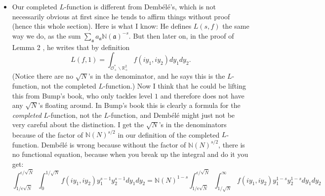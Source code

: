 \documentclass{article}
\theoremstyle{plain}
\begin{document}
\begin{itemize}
\item Our completed $L$-function is different from Demb\'{e}l\'{e}'s, which is not necessarily obvious at first since he tends to affirm things without proof (hence this whole section). Here is what I know: He defines $L(s,f)$ the same way we do, as the sum $\sum_{\mathfrak{a}}a_{\mathfrak{a}}\mathbb{N}(\mathfrak{a})^{-s}$. But then later on, in the proof of Lemma 2 \cite{dembele}, he writes that by definition
\begin{equation*}
L(f,1)= \int_{\mathcal{O}_+^*\backslash \mathbb{R}^2_+} f\left(iy_1,iy_2\right) dy_1 dy_2.
\end{equation*}
(Notice there are no $\sqrt{N}$'s in the denominator, and he says this is the $L$-function, not the completed $L$-function.) Now I think that he could be lifting this from Bump's book, who only tackles level $1$ and therefore does not have any $\sqrt{N}$'s floating around. In Bump's book this is clearly a formula for the \emph{completed} $L$-function, not the $L$-function, and Demb\'{e}l\'{e} might just not be very careful about the distinction. I get the $\sqrt{N}$'s in the denominators because of the factor of $\mathbb{N}(N)^{s/2}$ in our definition of the completed $L$-function. Demb\'{e}l\'{e} is wrong because without the factor of $\mathbb{N}(N)^{s/2}$, there is no functional equation, because when you break up the integral and do it you get:
\begin{equation*}
\int_{1/\epsilon\sqrt{\bar{N}}}^{\epsilon/\sqrt{\bar{N}}} \int_0^{1/\sqrt{N}} f(iy_1,iy_2)y_1^{s-1}y_2^{s-1}dy_1 dy_2 = \mathbb{N}(N)^{1-s}\int_{1/\epsilon\sqrt{\bar{N}}}^{\epsilon/\sqrt{\bar{N}}} \int_{1/\sqrt{N}}^{\infty} f(iy_1,iy_2)y_1^{1-s}y_2^{1-s}dy_1 dy_2
\end{equation*}


\end{itemize}
\end{document}
